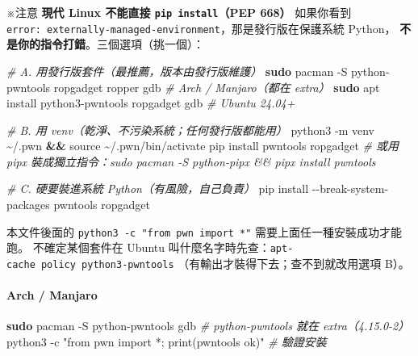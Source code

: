 \documentclass[10pt,a4paper]{article}
\newenvironment{Shaded}{\begin{snugshade}}{\end{snugshade}}
\newcommand{\AttributeTok}[1]{\textcolor[rgb]{0.13,0.29,0.53}{#1}}
\newcommand{\BuiltInTok}[1]{#1}
\newcommand{\CommentTok}[1]{\textcolor[rgb]{0.56,0.35,0.01}{\textit{#1}}}
\newcommand{\ExtensionTok}[1]{#1}
\newcommand{\FunctionTok}[1]{\textcolor[rgb]{0.13,0.29,0.53}{\textbf{#1}}}
\newcommand{\KeywordTok}[1]{\textcolor[rgb]{0.13,0.29,0.53}{\textbf{#1}}}
\newcommand{\NormalTok}[1]{#1}
\newcommand{\StringTok}[1]{\textcolor[rgb]{0.31,0.60,0.02}{#1}}
\renewenvironment{Shaded}{%
  \def\FrameCommand{\fboxsep=3.2pt\colorbox{shadecolor}}%
  \MakeFramed{\advance\hsize-\width\FrameRestore\small}%
}{%
  \endMakeFramed
}
\renewenvironment{quote}{%
  \begin{mdframed}[linewidth=0pt,innerleftmargin=0pt,innerrightmargin=0pt,
    innerbottommargin=0pt,innertopmargin=0pt,skipabove=0.55em,skipbelow=0.55em,
    leftmargin=0.9em,rightmargin=0.4em,startcode={\color{quotebar}\vrule width 2.6pt},%
    endcode={}]%
  \itshape\color{black}%
}{%
  \end{mdframed}%
}
\begin{document}
\begin{quote}
※注意 \textbf{現代 Linux 不能直接 \texttt{pip\ \allowbreak{}install}（PEP 668）}
如果你看到
\texttt{error:\allowbreak{}\ \allowbreak{}externally-\allowbreak{}managed-\allowbreak{}environment}，那是發行版在保護系統
Python， \textbf{不是你的指令打錯}。三個選項（挑一個）：

\begin{Shaded}
\begin{Highlighting}[]
\CommentTok{\# A. 用發行版套件（最推薦，版本由發行版維護）}
\FunctionTok{sudo}\NormalTok{ pacman }\AttributeTok{{-}S}\NormalTok{ python{-}pwntools ropgadget ropper gdb   }\CommentTok{\# Arch / Manjaro（都在 extra）}
\FunctionTok{sudo}\NormalTok{ apt install python3{-}pwntools ropgadget gdb       }\CommentTok{\# Ubuntu 24.04+}

\CommentTok{\# B. 用 venv（乾淨、不污染系統；任何發行版都能用）}
\ExtensionTok{python3} \AttributeTok{{-}m}\NormalTok{ venv \textasciitilde{}/.pwn }\KeywordTok{\&\&} \BuiltInTok{source}\NormalTok{ \textasciitilde{}/.pwn/bin/activate}
\ExtensionTok{pip}\NormalTok{ install pwntools ropgadget}
\CommentTok{\#    或用 pipx 裝成獨立指令：sudo pacman {-}S python{-}pipx \&\& pipx install pwntools}

\CommentTok{\# C. 硬要裝進系統 Python（有風險，自己負責）}
\ExtensionTok{pip}\NormalTok{ install }\AttributeTok{{-}{-}break{-}system{-}packages}\NormalTok{ pwntools ropgadget}
\end{Highlighting}
\end{Shaded}

本文件後面的 \texttt{python3\ \allowbreak{}-\allowbreak{}c\ \allowbreak{}"from\ \allowbreak{}pwn\ \allowbreak{}import\ \allowbreak{}*"}
需要上面任一種安裝成功才能跑。 不確定某個套件在 Ubuntu
叫什麼名字時先查：\texttt{apt-\allowbreak{}cache\ \allowbreak{}policy\ \allowbreak{}python3-\allowbreak{}pwntools}
（有輸出才裝得下去；查不到就改用選項 B）。
\end{quote}

\paragraph{Arch / Manjaro}\label{arch-manjaro}

\begin{Shaded}
\begin{Highlighting}[]
\FunctionTok{sudo}\NormalTok{ pacman }\AttributeTok{{-}S}\NormalTok{ python{-}pwntools gdb       }\CommentTok{\# python{-}pwntools 就在 extra（4.15.0{-}2）}
\ExtensionTok{python3} \AttributeTok{{-}c} \StringTok{"from pwn import *; print(\textquotesingle{}pwntools ok\textquotesingle{})"}     \CommentTok{\# 驗證安裝}
\end{Highlighting}
\end{Shaded}
\end{document}
